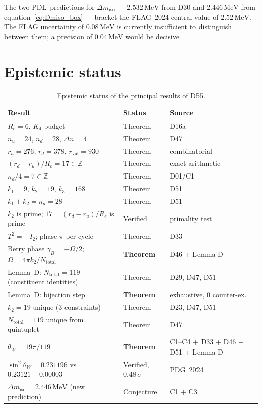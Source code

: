 \documentclass[12pt,a4paper]{article}
\theoremstyle{plain}
\theoremstyle{definition}
\theoremstyle{remark}
\newcommand{\PDL}{\textsc{PDL}}
\newcommand{\Kfour}{K_4}
\newcommand{\rval}{r_{\mathrm{val}}}
\renewcommand{\Re}{R_e}
\newcommand{\ru}{r_u}
\newcommand{\rd}{r_d}
\newcommand{\Dn}{\Delta n}
\newcommand{\thetaW}{\theta_W}
\newcommand{\sinW}{\sin^2\!\thetaW}
\newcommand{\Ntot}{N_{\mathrm{total}}}
\newcommand{\Dmiso}{\Delta m_{\mathrm{iso}}}
\newcommand{\kone}{k_1}
\newcommand{\ktwo}{k_2}
\newcommand{\kthree}{k_3}
\begin{document}
The two \PDL\ predictions for $\Dmiso$ — $2.532\,\mathrm{MeV}$ from D30 and $2.446\,\mathrm{MeV}$ from equation~\eqref{eq:Dmiso_box} — bracket the FLAG~2024 central value of $2.52\,\mathrm{MeV}$. The FLAG uncertainty of $0.08\,\mathrm{MeV}$ is currently insufficient to distinguish between them; a precision of $0.04\,\mathrm{MeV}$ would be decisive.

\section{Epistemic status}
\label{sec:epistemic}

\begin{table}[H]
\centering
\caption{Epistemic status of the principal results of D55.}
\label{tab:epistemic}
\bigskip
\begin{tabular}{p{7.5cm}p{3cm}p{4cm}}
\toprule
Result & Status & Source \\
\midrule
$\Re = 6$, $\Kfour$ budget & Theorem & D16a \\
$n_u = 24$, $n_d = 28$, $\Dn = 4$ & Theorem & D47 \\
$\ru = 276$, $\rd = 378$, $\rval = 930$ & Theorem & combinatorial \\
$(\rd-\ru)/\Re = 17 \in \mathbb{Z}$ & Theorem & exact arithmetic \\
$n_d/4 = 7 \in \mathbb{Z}$ & Theorem & D01/C1 \\
$\kone = 9$, $\ktwo = 19$, $\kthree = 168$ & Theorem & D51 \\
$\kone + \ktwo = n_d = 28$ & Theorem & D51 \\
$\ktwo$ is prime; $17 = (\rd-\ru)/\Re$ is prime & Verified & primality test \\
$T^2 = -I_2$; phase $\pi$ per cycle & Theorem & D33 \\
Berry phase $\gamma_B = -\Omega/2$; $\Omega = 4\pi\ktwo/\Ntot$ & \textcolor{resolvedgreen}{\textbf{Theorem}} & D46 + Lemma D \\
Lemma~D: $\Ntot = 119$ (constituent identities) & Theorem & D29, D47, D51 \\
Lemma~D: bijection step & \textcolor{resolvedgreen}{\textbf{Theorem}} & exhaustive, 0 counter-ex. \\
$\ktwo = 19$ unique (3 constraints) & Theorem & D23, D47, D51 \\
$\Ntot = 119$ unique from quintuplet & Theorem & D47 \\
$\thetaW = 19\pi/119$ & \textcolor{resolvedgreen}{\textbf{Theorem}} & C1--C4 + D33 + D46 + D51 + Lemma D \\
$\sinW = 0.231196$ vs $0.23121 \pm 0.00003$ & Verified, $0.48\,\sigma$ & PDG~2024 \\
$\Dmiso = 2.446\,\mathrm{MeV}$ (new prediction) & Conjecture & C1 + C3 \\
\bottomrule
\end{tabular}
\end{table}
\end{document}
